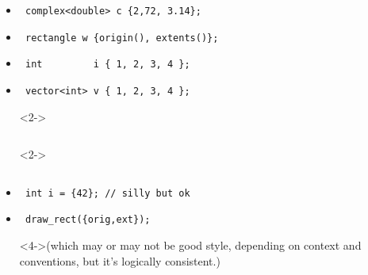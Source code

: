 \begin{frame}[fragile]
\begin{columns}[t]
\begin{itemize}
\item<2->{\scriptsize\begin{verbatim} complex<double> c {2,72, 3.14}; \end{verbatim}}
\item<2->{\scriptsize\begin{verbatim} rectangle w {origin(), extents()};\end{verbatim}}
\item<2->{\scriptsize\begin{verbatim} int         i { 1, 2, 3, 4 }; \end{verbatim}}
\item<2->{\scriptsize\begin{verbatim} vector<int> v { 1, 2, 3, 4 };  \end{verbatim}}
\item[] <2->{\scriptsize\begin{verbatim} \end{verbatim}}
\item[] <2->{\scriptsize\begin{verbatim} \end{verbatim}}
\item<3->{\scriptsize\begin{verbatim} int i = {42}; // silly but ok\end{verbatim}}
\item<4->{\scriptsize\begin{verbatim} draw_rect({orig,ext});  \end{verbatim}}
\item[]<4->{\scriptsize(which may or may not be good style, depending on context
  and conventions, but it's logically consistent.)}
\end{itemize}

\end{columns}
\end{frame}

